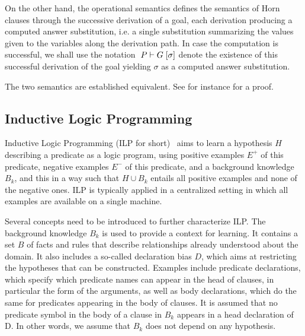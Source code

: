On the other hand, the operational semantics defines the semantics of Horn clauses through the successive derivation of a goal, each derivation producing a computed answer substitution, i.e. a single substitution summarizing the values given to the variables along the derivation path. In case the computation is successful, we shall use the notation 
\( \mbox{$\; {P} \vdash {G} \; [{\sigma}] $} \)
 denote the existence of this successful derivation of the goal 
 yielding $\sigma$ as a computed answer substitution. 

The two semantics are established equivalent. See for instance 
\cite{Lloyd} for a proof.


% 
%
% 
% 


\subsection{Inductive Logic Programming}

Inductive Logic Programming (ILP for short)~\cite{muggleton1995inverse}
aims to learn a hypothesis $H$
describing a predicate as a logic program, using positive examples $E^+$ of this predicate, negative
examples $E^-$ of this predicate, and a background knowledge $B_k$, and this in a way such that
$H \cup B_k$ entails all positive examples and none of the negative ones.
ILP is typically applied in a centralized setting 
in which all examples are available on a single machine.

Several concepts need to be introduced to further characterize ILP.
The background knowledge $B_k$ is used to provide a context for
learning. It contains a set $B$ of facts and rules that describe
relationships already understood about the domain. It also includes a
so-called declaration bias $D$, which aims at restricting the
hypotheses that can be constructed. Examples include predicate
declarations, which specify which predicate names can appear in the
head of clauses, in particular the form of the arguments, as well as body
declarations, which do the same for predicates appearing in the body
of clauses. It is assumed that no predicate symbol in the body of a
clause in $B_k$ appears in a head declaration of D. In other words, we
assume that $B_k$ does not depend on any hypothesis.

